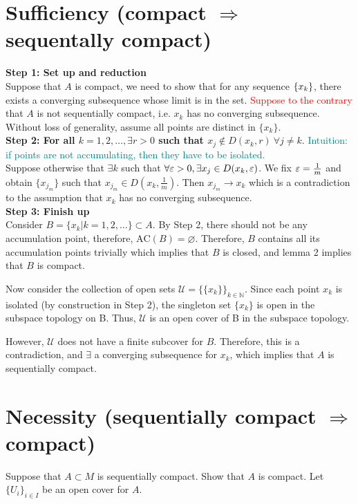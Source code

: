 \documentclass[12pt, letterpaper]{article}
\begin{document}
\begin{prf*}
\section{Sufficiency (compact $\Rightarrow$ sequentally compact)}
\textbf{Step 1: Set up and reduction}\\

Suppose that $A$ is compact, we need to show that for any sequence $\qty{x_k}$, there exists a converging subsequence whose limit is in the set. \textcolor{red}{Suppose to the contrary} that $A$ is not sequentially compact, i.e. $x_k$ has no converging subsequence. Without loss of generality, assume all points are distinct in $\{x_k\}$.\\


\noindent \textbf{Step 2: For all $k = 1, 2, \ldots, \exists r>0$ such that $x_j\notin D(x_k, r) \ \forall j\neq k$}. \textcolor{teal}{Intuition: if points are not accumulating, then they have to be isolated.}\\


Suppose otherwise that $\exists k$ such that $\forall {\varepsilon}>0, \exists x_j\in D(x_k, {\varepsilon})$. We fix ${\varepsilon} = \frac{1}{m}$ and obtain $\{x_{j_m}\}$ such that $x_{j_m} \in D(x_k, \frac{1}{m})$. Then $x_{j_m}\rightarrow x_k$ which is a contradiction to the assumption that $x_k$ has no converging subsequence. \\

\textbf{Step 3: Finish up}\\

Consider $B = \{x_k|k = 1, 2, \ldots\}\subset A$. By Step 2, there should not be any accumulation point, therefore, $\mathrm{AC}(B) = \varnothing$. Therefore, $B$ contains all its accumulation points trivially which implies that $B$ is closed, and lemma 2 implies that $B$ is compact.

Now consider the collection of open sets $\mathcal{U} = \{ \{x_k\} \}_{k \in \mathbb{N}}$. Since each point $x_k$ is isolated (by construction in Step 2), the singleton set $\{x_k\}$ is open in the subspace topology on B. Thus, $\mathcal{U}$ is an open cover of B in the subspace topology.

However, $\mathcal U$ does not have a finite subcover for $B$. Therefore, this is a contradiction, and $\exists$ a converging subsequence for $x_k$, which implies that $A$ is sequentially compact. 


\section{Necessity (sequentially compact $\Rightarrow$ compact)}
Suppose that $A\subset M$ is sequentially compact. Show that $A$ is compact. Let $\{U_i\}_{i\in I}$ be an open cover for $A$. 


\end{prf*}
\end{document}
